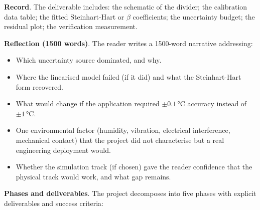\begin{project}
\textbf{Record}. The deliverable includes: the schematic of the
divider; the calibration data table; the fitted Steinhart-Hart or
$\beta$ coefficients; the uncertainty budget; the residual plot;
the verification measurement.

\textbf{Reflection (1500 words)}. The reader writes a 1500-word
narrative addressing:

\begin{itemize}[leftmargin=*]
  \item Which uncertainty source dominated, and why.
  \item Where the linearised model failed (if it did) and what the
    Steinhart-Hart form recovered.
  \item What would change if the application required
    $\pm 0.1 \,\si{\degreeCelsius}$ accuracy instead of
    $\pm 1 \,\si{\degreeCelsius}$.
  \item One environmental factor (humidity, vibration, electrical
    interference, mechanical contact) that the project did not
    characterise but a real engineering deployment would.
  \item Whether the simulation track (if chosen) gave the reader
    confidence that the physical track would work, and what gap
    remains.
\end{itemize}

\textbf{Phases and deliverables}. The project decomposes into five
phases with explicit deliverables and success criteria:


\end{project}
